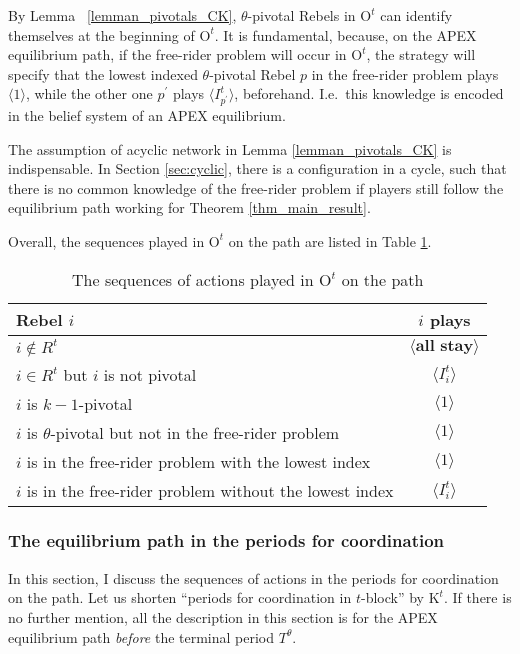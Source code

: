 \documentclass[12pt,letter]{article}
\newcommand{\Kappa}{\mathrm{K}}
\newcommand{\Omicron}{\mathrm{O}}
\theoremstyle{definition}
\theoremstyle{remark}
\theoremstyle{claim}
\begin{document}
By Lemma ~\ref{lemman_pivotals_CK}, $\theta$-pivotal Rebels in $\Omicron^t$ can identify themselves at the beginning of $\Omicron^t$. It is fundamental, because, on the APEX equilibrium path, if the free-rider problem will occur in $\Omicron^t$, the strategy will specify that the lowest indexed $\theta$-pivotal Rebel $p$ in the free-rider problem plays $\langle 1 \rangle$, while the other one $p^{'}$ plays $\langle I^t_{p^{'}} \rangle$, beforehand. I.e.~this knowledge is encoded in the belief system of an APEX equilibrium.

The assumption of acyclic network in Lemma \ref{lemman_pivotals_CK} is indispensable. In Section \ref{sec:cyclic}, there is a configuration in a cycle, such that there is no common knowledge of the free-rider problem if players still follow the equilibrium path working for Theorem \ref{thm_main_result}. 

Overall, the sequences played in $\Omicron^t$ on the path are listed in Table \ref{Table_msg_RP_path}.

\begin{table}[!htbp]
\caption{The sequences of actions played in $\Omicron^t$ on the path}
\label{Table_msg_RP_path}
\begin{center}
\begin{tabular}{l c}
Rebel $i$ & $i$ plays\\
\hline
\hline
$i\notin R^t$				& $\langle \textbf{all stay} \rangle$  \\
$i\in R^t$ but $i$ is not pivotal	 					 			& $\langle I^t_i \rangle$  \\
$i$ is $k-1$-pivotal	 					 			& $\langle 1 \rangle$  \\
$i$ is $\theta$-pivotal but not in the free-rider problem	 					 			& $\langle 1 \rangle$  \\
$i$ is in the free-rider problem with the lowest index	 					 			& $\langle 1 \rangle$  \\
$i$ is in the free-rider problem without the lowest index	 					 			& $\langle I^t_i \rangle$  \\
\hline
\end{tabular}
\end{center}
\end{table}


\subsubsection{The equilibrium path in the periods for coordination}
\label{sec:eq_cd}
In this section, I discuss the sequences of actions in the periods for coordination on the path. Let us shorten ``periods for coordination  in $t$-block'' by $\Kappa^{t}$. If there is no further mention, all the description in this section is for the APEX equilibrium path \textit{before} the terminal period $T^{\theta}$. 
\end{document}
